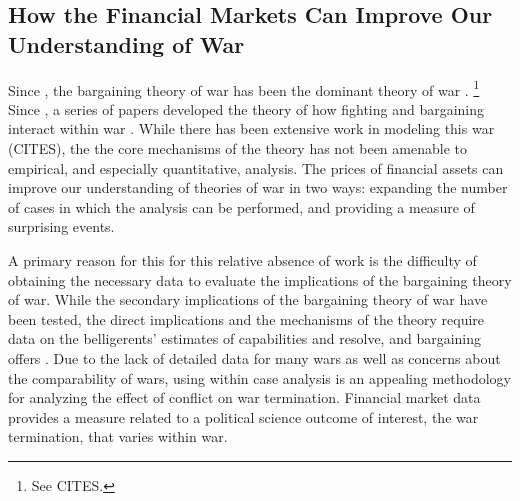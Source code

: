 \subsection{How the Financial Markets Can Improve Our Understanding of War}
\label{bonds_battles:sec:how-prices-financial-1}

Since \parencite{Fearon1995}, the bargaining theory of war has been the dominant theory of war \parencite{Reiter2003}.%
\footnote{See CITES.}
Since \textcite{Fearon1995}, a series of papers developed the theory of how fighting and bargaining interact within war \parencites{FilsonWerner2002}{Slantchev2003}{SmithStam2004}{Powell2004}{LeventogluSlantchev2007}{LangloisLanglois2009}{WolfordReiterCarrubba2011}.
While there has been extensive work in modeling this war (CITES), the the core mechanisms of the theory has not been amenable to empirical, and especially quantitative, analysis.
The prices of financial assets can improve our understanding of theories of war in two ways: expanding the number of cases in which the analysis can be performed, and providing a measure of surprising events.

A primary reason for this for this relative absence of work is the difficulty of obtaining the necessary data to evaluate the implications of the bargaining theory of war.
While the secondary implications of the bargaining theory of war have been tested, the direct implications and the mechanisms of the theory require data on the belligerents' estimates of capabilities and resolve, and bargaining offers \parencite[32]{Reiter2003}.
Due to the lack of detailed data for many wars as well as concerns about the comparability of wars, using within case analysis is an appealing methodology for analyzing the effect of conflict on war termination.
Financial market data provides a measure related to a political science outcome of interest, the war termination, that varies within war.

